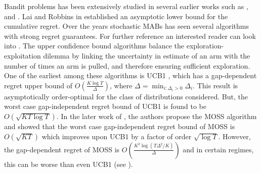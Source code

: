 
	Bandit problems has been extensively studied in several earlier works such as \citet{thompson1933likelihood}, \citet{robbins1952some} and \citet{lai1985asymptotically}. Lai and Robbins in  \citet{lai1985asymptotically} established an asymptotic lower bound for the cumulative regret. Over the years stochastic MABs has seen several algorithms with strong regret guarantees. For further reference an interested reader can look into \citet{bubeck2012regret}. The upper confidence bound algorithms balance the exploration-exploitation dilemma by linking the uncertainty in estimate of an arm with the number of times an arm is pulled, and therefore ensuring sufficient exploration. One of the earliest among these algorithms is UCB1 \citep{auer2002finite}, which has a gap-dependent regret upper bound of  $O\left(\frac{K\log T}{\Delta}\right)$, where $\Delta = \min_{i:\Delta_i>0} \Delta_i$. This result is asymptotically order-optimal for the class of distributions considered. But, the worst case gap-independent regret bound of UCB1 is found to be  $O \left(\sqrt{KT\log T}\right)$. In the later work of \citet{audibert2009minimax}, the authors propose the MOSS algorithm and showed that the worst case gap-independent regret bound of MOSS is $O\left( \sqrt{KT} \right)$ which improves upon UCB1 by a factor of order $\sqrt{\log T}$. However, the gap-dependent regret of MOSS is $O\left( \frac{K^{2}\log\left(T\Delta^{2}/K\right)}{\Delta}\right)$ and in certain regimes, this can be worse than even UCB1 (see \citet{audibert2009minimax,lattimore2015optimally}).
	
